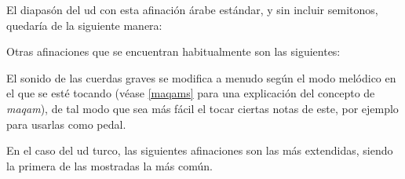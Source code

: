 El diapasón del ud con esta afinación árabe estándar, y sin incluir semitonos, quedaría de la siguiente manera:



Otras afinaciones que se encuentran habitualmente son las siguientes:

\begin{center}
\end{center}

El sonido de las cuerdas graves se modifica a menudo según el modo melódico en el que se esté tocando (véase \ref{maqams} para una explicación del concepto de \emph{maqam}), de tal modo que sea más fácil el tocar ciertas notas de este, por ejemplo para usarlas como pedal.

En el caso del ud turco, las siguientes afinaciones son las más extendidas, siendo la primera de las mostradas la más común.

\begin{center}
\end{center}

